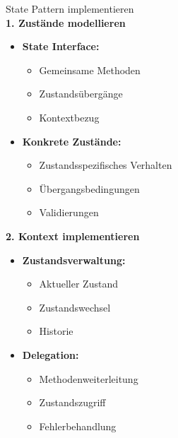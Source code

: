 \begin{KR}{State Pattern implementieren}\\
\textbf{1. Zustände modellieren}
\begin{itemize}
    \item \textbf{State Interface:}
    \begin{itemize}
        \item Gemeinsame Methoden
        \item Zustandsübergänge
        \item Kontextbezug
    \end{itemize}
    
    \item \textbf{Konkrete Zustände:}
    \begin{itemize}
        \item Zustandsspezifisches Verhalten
        \item Übergangsbedingungen
        \item Validierungen
    \end{itemize}
\end{itemize}

\textbf{2. Kontext implementieren}
\begin{itemize}
    \item \textbf{Zustandsverwaltung:}
    \begin{itemize}
        \item Aktueller Zustand
        \item Zustandswechsel
        \item Historie
    \end{itemize}
    
    \item \textbf{Delegation:}
    \begin{itemize}
        \item Methodenweiterleitung
        \item Zustandszugriff
        \item Fehlerbehandlung
    \end{itemize}
\end{itemize}
\end{KR}

